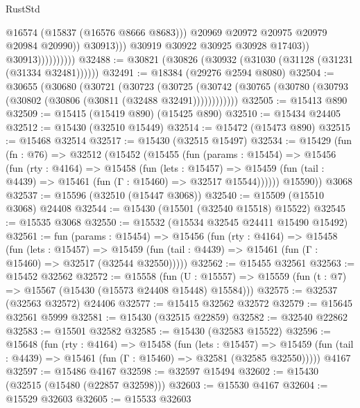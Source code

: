 \begin{lexlean}{RustStd}
\begin{coremodule}
{\begin{coremodule}
{{{{{{{{{{{{{{{{{{{{{{{{{{{{{{{{{{{{{{{{{{{{{{{{{{{{{{{{{{{{                                        @16574
                                        (@15837 (@16576 @8666 @8683)))
                                      @20969
                                      @20972
                                      @20975
                                      @20979
                                      @20984
                                      @20990))
                                  @30913)))
                            @30919
                            @30922
                            @30925
                            @30928
                            @17403))
                        @30913))))))))))
@32488 := @30821 (@30826 (@30932 (@31030 (@31128 (@31231 (@31334 @32481))))))
@32491 := @18384 (@29276 @2594 @8080)
@32504 := @30655
    (@30680
      (@30721
        (@30723
          (@30725 (@30742 (@30765 (@30780 (@30793 (@30802 (@30806 (@30811 (@32488 @32491))))))))))))
@32505 := @15413 @890
@32509 := @15415 (@15419 @890) (@15425 @890)
@32510 := @15434 @24405
@32512 := @15430 (@32510 @15449)
@32514 := @15472 (@15473 @890)
@32515 := @15468 @32514
@32517 := @15430 (@32515 @15497)
@32534 := @15429
    (fun (fn : @76) =>
    @32512
      (@15452
        (@15455
          (fun (params : @15454) =>
          @15456
            (fun (rty : @4164) =>
            @15458
              (fun (lets : @15457) =>
              @15459 (fun (tail : @4439) => @15461 (fun (Γ : @15460) => @32517 @15544))))))
        @15590))
    @3068
@32537 := @15596 (@32510 (@15447 @3068))
@32540 := @15509 (@15510 @3068) @24408
@32544 := @15430 (@15501 (@32540 @15518) @15522)
@32545 := @15535 @3068
@32550 := @15532 (@15534 @32545 @24411 @15490 @15492)
@32561 := fun (params : @15454) =>
  @15456
    (fun (rty : @4164) =>
    @15458
      (fun (lets : @15457) =>
      @15459 (fun (tail : @4439) => @15461 (fun (Γ : @15460) => @32517 (@32544 @32550)))))
@32562 := @15455 @32561
@32563 := @15452 @32562
@32572 := @15558
    (fun (U : @15557) => @15559 (fun (t : @7) => @15567 (@15430 (@15573 @24408 @15448) @15584)))
@32575 := @32537 (@32563 @32572) @24406
@32577 := @15415 @32562 @32572
@32579 := @15645 @32561 @5999
@32581 := @15430 (@32515 @22859)
@32582 := @32540 @22862
@32583 := @15501 @32582
@32585 := @15430 (@32583 @15522)
@32596 := @15648
    (fun (rty : @4164) =>
    @15458
      (fun (lets : @15457) =>
      @15459 (fun (tail : @4439) => @15461 (fun (Γ : @15460) => @32581 (@32585 @32550)))))
    @4167
@32597 := @15486 @4167
@32598 := @32597 @15494
@32602 := @15430 (@32515 (@15480 (@22857 @32598)))
@32603 := @15530 @4167
@32604 := @15529 @32603
@32605 := @15533 @32603
}}}}}}}}}}}}}}}}}}}}}}}}}}}}}}}}}}}}}}}}}}}}}}}}}}}}}}}}}}}}
\end{coremodule}}
\end{coremodule}
\end{lexlean}
